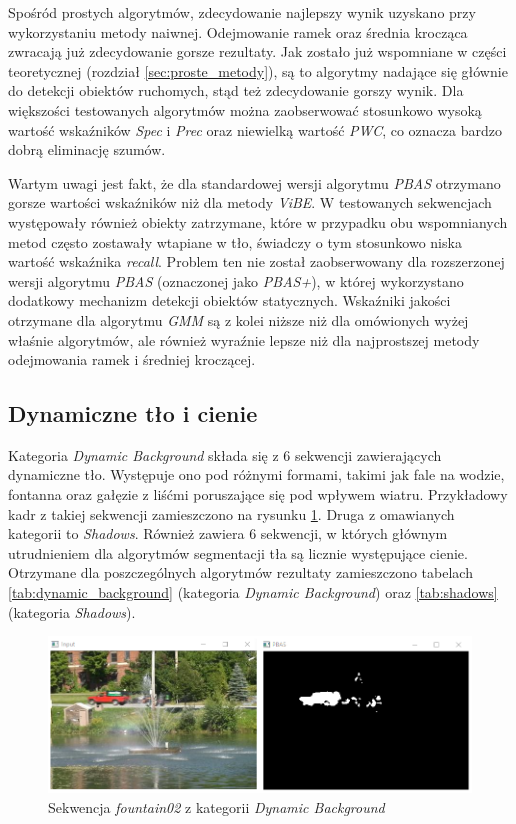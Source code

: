 Spośród prostych algorytmów, zdecydowanie najlepszy wynik uzyskano przy wykorzystaniu metody naiwnej. 
Odejmowanie ramek oraz średnia krocząca zwracają już zdecydowanie gorsze rezultaty. 
Jak zostało już wspomniane w części teoretycznej (rozdział \ref{sec:proste_metody}), są to algorytmy nadające się głównie do detekcji obiektów ruchomych, stąd też zdecydowanie gorszy wynik.
Dla większości testowanych algorytmów można zaobserwować stosunkowo wysoką wartość wskaźników \textit{Spec} i \textit{Prec} oraz niewielką wartość \textit{PWC}, co oznacza bardzo dobrą eliminację szumów. 

Wartym uwagi jest fakt, że dla standardowej wersji algorytmu \textit{PBAS} otrzymano gorsze wartości wskaźników niż dla metody \textit{ViBE}. 
W testowanych sekwencjach występowały również obiekty zatrzymane, które w przypadku obu wspomnianych metod często zostawały wtapiane w tło, świadczy o tym stosunkowo niska wartość wskaźnika \textit{recall}. 
Problem ten nie został zaobserwowany dla rozszerzonej wersji algorytmu \textit{PBAS} (oznaczonej jako \textit{PBAS+}), w której wykorzystano dodatkowy mechanizm detekcji obiektów statycznych. 
Wskaźniki jakości otrzymane dla algorytmu \textit{GMM} są z kolei niższe niż dla omówionych wyżej właśnie algorytmów, ale również wyraźnie lepsze niż dla najprostszej metody odejmowania ramek i średniej kroczącej. 


\subsection{Dynamiczne tło i cienie}
\label{subsec:dynamiczne_tlo_cienie}

Kategoria \textit{Dynamic Background} składa się z 6 sekwencji zawierających dynamiczne tło. 
Występuje ono pod różnymi formami, takimi jak fale na wodzie, fontanna oraz gałęzie z liśćmi poruszające się pod wpływem wiatru. 
Przykładowy kadr z takiej sekwencji zamieszczono na rysunku \ref{fig:dynamic_example}. 
Druga z omawianych kategorii to \textit{Shadows}. 
Również zawiera 6 sekwencji, w których głównym utrudnieniem dla algorytmów segmentacji tła są licznie występujące cienie. 
Otrzymane dla poszczególnych algorytmów rezultaty zamieszczono tabelach \ref{tab:dynamic_background} (kategoria \textit{Dynamic Background}) oraz \ref{tab:shadows} (kategoria \textit{Shadows}).

    \begin{figure}[h]
			\centering
			\includegraphics[scale=0.65]{img/5/dynamic_example.png}
			\caption{Sekwencja \textit{fountain02} z kategorii \textit{Dynamic Background}}
			\label{fig:dynamic_example}
	\end{figure}

